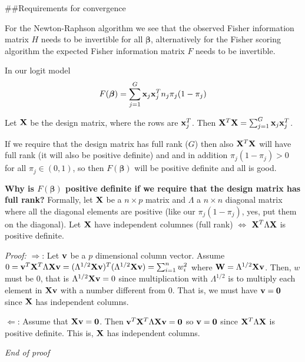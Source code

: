 \documentclass[
  ignorenonframetext,
]{beamer}
\begin{document}
\begin{frame}
\#\#Requirements for convergence

For the Newton-Raphson algorithm we see that the observed Fisher
information matrix \(H\) needs to be invertible for all
\(\boldsymbol{\beta}\), alternatively for the Fisher scoring algorithm
the expected Fisher information matrix \(F\) needs to be invertible.

In our logit model
\[F(\boldsymbol{\beta})=\sum_{j=1}^G {\bf x}_j {\bf x}_j^T n_j \pi_j (1-\pi_j)\]

Let \({\bf X}\) be the design matrix, where the rows are
\({\bf x}_j^T\). Then
\({\bf X}^T{\bf X}=\sum_{j=1}^G {\bf x}_j {\bf x}_j^T\).

If we require that the design matrix has full rank (\(G\)) then also
\({\bf X}^T{\bf X}\) will have full rank (it will also be positive
definite) and and in addition \(\pi_j(1-\pi_j)>0\) for all
\(\pi_j \in (0,1)\), so then \(F(\boldsymbol{\beta})\) will be positive
definite and all is good.
\end{frame}

\begin{frame}
\textbf{Why is \(F(\boldsymbol{\beta})\) positive definite if we require
that the design matrix has full rank?} Formally, let \({\bf X}\) be a
\(n\times p\) matrix and \(\Lambda\) a \(n\times n\) diagonal matrix
where all the diagonal elements are positive (like our
\(\pi_j(1-\pi_j)\), yes, put them on the diagonal). Let \({\bf X}\) have
independent columnes (full rank) \(\Leftrightarrow\)
\({\bf X}^T\Lambda{\bf X}\) is positive definite.

\emph{Proof:} \(\Rightarrow\): Let \({\bf v}\) be a \(p\) dimensional
column vector. Assume
\(0={\bf v}^T {\bf X}^T \Lambda {\bf X} {\bf v}=(\Lambda^{1/2}{\bf X}{\bf v})^T(\Lambda^{1/2}{\bf X}{\bf v})=\sum_{i=1}^n w_i^2\)
where \({\bf W}=\Lambda^{1/2}{\bf X}{\bf v}\). Then, \(w\) must be 0,
that is \(\Lambda^{1/2}{\bf X}{\bf v}=0\) since multiplication with
\(\Lambda^{1/2}\) is to multiply each element in \({\bf X}{\bf v}\) with
a number different from 0. That is, we must have \({\bf v}={\bf 0}\)
since \({\bf X}\) has independent columns.

\(\Leftarrow\): Assume that \({\bf X}{\bf v}={\bf 0}\). Then
\({\bf v}^T {\bf X}^T \Lambda {\bf X} {\bf v}={\bf 0}\) so
\({\bf v}={\bf 0}\) since \({\bf X}^T\Lambda{\bf X}\) is positive
definite. This is, \({\bf X}\) has independent columns.

\emph{End of proof}
\end{frame}
\end{document}
